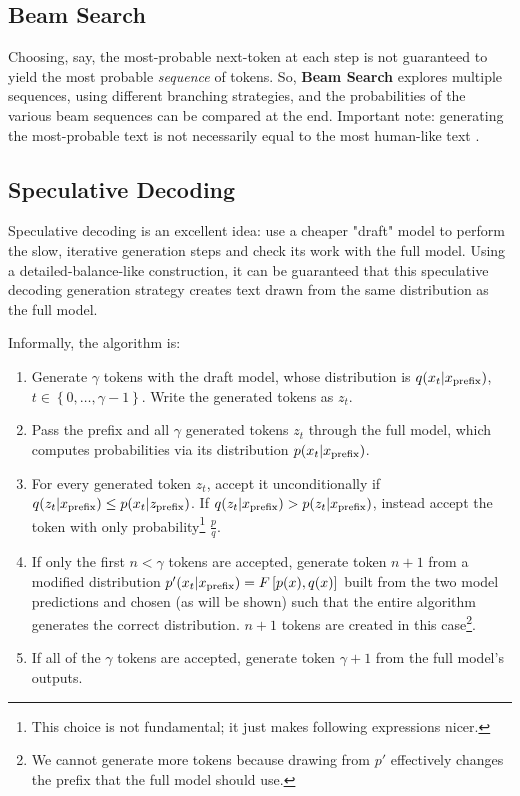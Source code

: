\subsection{Beam Search \label{subsec_beam_search}}

Choosing, say, the most-probable next-token at each step is not guaranteed to yield the most
probable \textit{sequence} of tokens. So, \textbf{Beam Search} explores multiple sequences, using
different branching strategies, and the probabilities of the various beam sequences can be compared
at the end. Important note: generating the most-probable text is not necessarily equal to the most
human-like text \cite{holtzman2020curious}.



\subsection{Speculative Decoding \label{subsec_speculative_decoding}}

Speculative decoding \cite{leviathan2023fastinferencetransformersspeculative} is an excellent idea:
use a cheaper "draft" model to perform the slow, iterative generation steps and check its work with
the full model. Using a detailed-balance-like construction, it can be guaranteed that this
speculative decoding generation strategy creates text drawn from the same distribution as the full
model.

Informally, the algorithm is:
\begin{enumerate}
    \item Generate $ \gamma  $ tokens with the draft model, whose distribution is $ q(x _{ t }|x _{
        {\rm  prefix} }) $, $ t \in \left \{ 0, \ldots , \gamma -1 \right \} $. Write the generated
        tokens as $ z _{ t } $.
    \item Pass the prefix and all $ \gamma  $ generated tokens $ z _{ t } $ through the full model,
        which computes probabilities via its distribution $ p(x _{ t }|x _{ {\rm  prefix} }) $.
    \item For every generated token $ z _{ t } $, accept it
        unconditionally if $ q(z_t| x _{ {\rm  prefix} })\le p(x_t| z _{ {\rm  prefix} })  $. If $
         q(z_t| x _{ {\rm  prefix} }) > p(z_t| x _{ {\rm  prefix} })$, instead accept the token
        with only probability\footnote{This choice is not fundamental; it just makes following
        expressions nicer.} $ \frac{ p }{ q } $.
    \item If only the first $ n < \gamma  $ tokens are accepted, generate token $ n+1 $ from a
        modified distribution $ p'(x_t| x _{ {\rm prefix} }) = F \left [ p(x), q(x) \right ]$ built
        from the two model predictions and chosen (as will be shown) such that the entire algorithm
        generates the correct distribution. $ n+1 $ tokens are created in this case\footnote{We
        cannot generate more tokens because drawing from $ p' $ effectively changes the prefix that the
        full model should use.}.
    \item If all of the $ \gamma  $ tokens are accepted, generate token $ \gamma +1 $ from the full
        model's outputs.
\end{enumerate}

